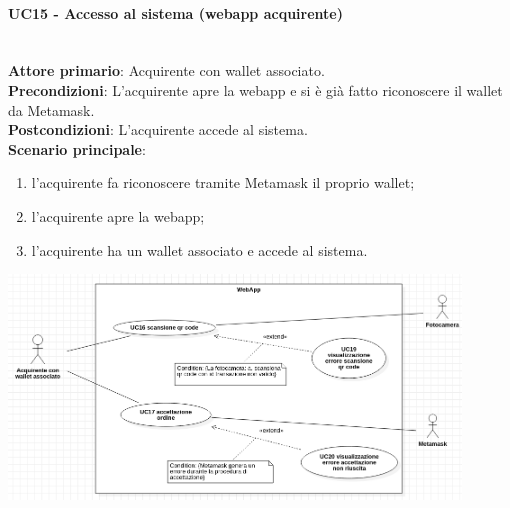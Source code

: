 \documentclass[a4paper, 12pt]{article}
\begin{document}
\paragraph{UC15 - Accesso al sistema (webapp acquirente)}\\
\textbf{Attore primario}: Acquirente con wallet associato.\\
\textbf{Precondizioni}: L'acquirente apre la webapp e si è già fatto riconoscere il wallet da Metamask.\\
\textbf{Postcondizioni}: L'acquirente accede al sistema.\\
\textbf{Scenario principale}:
\begin{enumerate}
    \item l'acquirente fa riconoscere tramite Metamask il proprio wallet;
    \item l'acquirente apre la webapp;
    \item l'acquirente ha un wallet associato e accede al sistema.
\end{enumerate}

\includegraphics[width=0.9\textwidth]{UseCase_webapp3}
\end{document}
